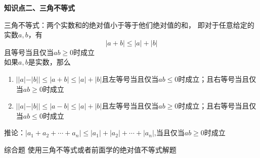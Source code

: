 \documentclass[11pt,a4paper]{article}
\begin{document}
\clearpage
\begin{formal}
    {\large \textbf{知识点二、三角不等式}}
\end{formal}
三角不等式：两个实数和的绝对值小于等于他们绝对值的和，
即对于任意给定的实数$a,b$，有$$|a+b|\le|a|+|b|$$且等号当且仅当$ab\ge0$时成立\\
如果$a,b$是实数，那么

\begin{enumerate}
    \item $||a|-|b||\le|a+b|\le |a|+|b|$且左等号当且仅当$ab\le0$时成立；且右等号当且仅当$ab\ge0$时成立
    \item $||a|-|b||\le|a-b|\le |a|+|b|$且左等号当且仅当$ab\ge0$时成立；且右等号当且仅当$ab\le0$时成立
\end{enumerate}

推论：$|a_1+a_2+\cdots+a_n|\le |a_1|+|a_2|+\cdots+|a_n|$,当且仅当$ab\ge0$时成立


\begin{tcolorbox} 
    \centering
    综合题
    \tcblower %
    使用三角不等式或者前面学的绝对值不等式解题
\end{tcolorbox}
\end{document}
